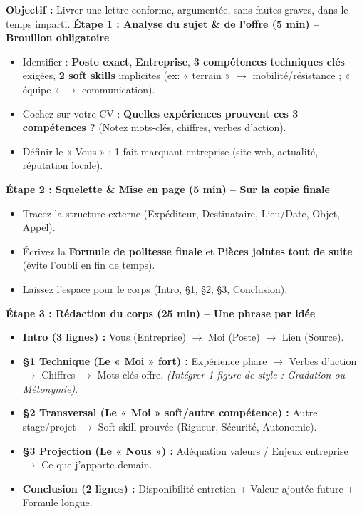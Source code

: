 \documentclass[11pt]{article}
\begin{document}
\begin{methode}
\textbf{Objectif :} Livrer une lettre conforme, argumentée, sans fautes graves, dans le temps imparti.
\medskip
\textbf{Étape 1 : Analyse du sujet \& de l'offre (5 min) -- \textbf{Brouillon obligatoire}}
\begin{itemize}
\item Identifier : \textbf{Poste exact}, \textbf{Entreprise}, \textbf{3 compétences techniques clés} exigées, \textbf{2 soft skills} implicites (ex: « terrain » $\rightarrow$ mobilité/résistance ; « équipe » $\rightarrow$ communication).
\item Cochez sur votre CV : \textbf{Quelles expériences prouvent ces 3 compétences ?} (Notez mots-clés, chiffres, verbes d'action).
\item Définir le « Vous » : 1 fait marquant entreprise (site web, actualité, réputation locale).
\end{itemize}

\textbf{Étape 2 : Squelette \& Mise en page (5 min) -- \textbf{Sur la copie finale}}
\begin{itemize}
\item Tracez la structure externe (Expéditeur, Destinataire, Lieu/Date, Objet, Appel).
\item Écrivez la \textbf{Formule de politesse finale} et \textbf{Pièces jointes} \textbf{tout de suite} (évite l'oubli en fin de temps).
\item Laissez l'espace pour le corps (Intro, §1, §2, §3, Conclusion).
\end{itemize}

\textbf{Étape 3 : Rédaction du corps (25 min) -- \textbf{Une phrase par idée}}
\begin{itemize}
\item \textbf{Intro (3 lignes) :} Vous (Entreprise) $\rightarrow$ Moi (Poste) $\rightarrow$ Lien (Source).
\item \textbf{§1 Technique (Le « Moi » fort) :} Expérience phare $\rightarrow$ Verbes d'action $\rightarrow$ Chiffres $\rightarrow$ Mots-clés offre. \textit{(Intégrer 1 figure de style : Gradation ou Métonymie)}.
\item \textbf{§2 Transversal (Le « Moi » soft/autre compétence) :} Autre stage/projet $\rightarrow$ Soft skill prouvée (Rigueur, Sécurité, Autonomie).
\item \textbf{§3 Projection (Le « Nous ») :} Adéquation valeurs / Enjeux entreprise $\rightarrow$ Ce que j'apporte demain.
\item \textbf{Conclusion (2 lignes) :} Disponibilité entretien + Valeur ajoutée future + Formule longue.
\end{itemize}


\end{methode}
\end{document}
